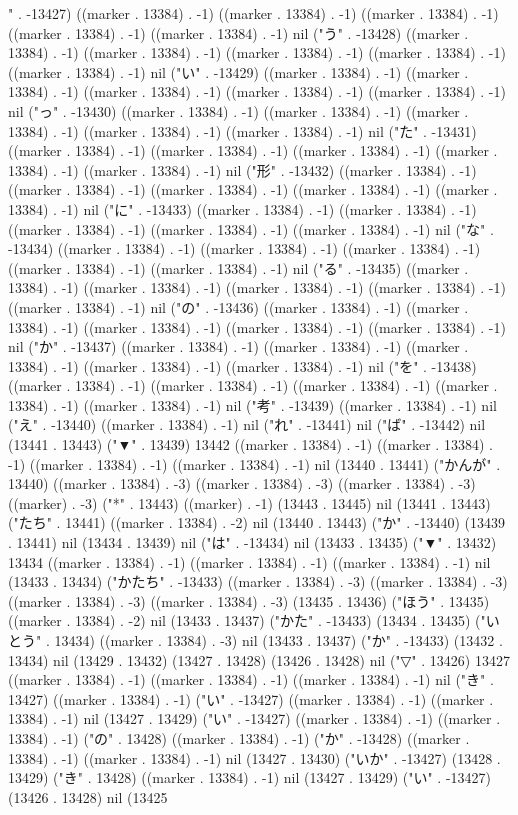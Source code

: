 " . -13427) ((marker . 13384) . -1) ((marker . 13384) . -1) ((marker . 13384) . -1) ((marker . 13384) . -1) ((marker . 13384) . -1) nil ("う" . -13428) ((marker . 13384) . -1) ((marker . 13384) . -1) ((marker . 13384) . -1) ((marker . 13384) . -1) ((marker . 13384) . -1) nil ("い" . -13429) ((marker . 13384) . -1) ((marker . 13384) . -1) ((marker . 13384) . -1) ((marker . 13384) . -1) ((marker . 13384) . -1) nil ("っ" . -13430) ((marker . 13384) . -1) ((marker . 13384) . -1) ((marker . 13384) . -1) ((marker . 13384) . -1) ((marker . 13384) . -1) nil ("た" . -13431) ((marker . 13384) . -1) ((marker . 13384) . -1) ((marker . 13384) . -1) ((marker . 13384) . -1) ((marker . 13384) . -1) nil ("形" . -13432) ((marker . 13384) . -1) ((marker . 13384) . -1) ((marker . 13384) . -1) ((marker . 13384) . -1) ((marker . 13384) . -1) nil ("に" . -13433) ((marker . 13384) . -1) ((marker . 13384) . -1) ((marker . 13384) . -1) ((marker . 13384) . -1) ((marker . 13384) . -1) nil ("な" . -13434) ((marker . 13384) . -1) ((marker . 13384) . -1) ((marker . 13384) . -1) ((marker . 13384) . -1) ((marker . 13384) . -1) nil ("る" . -13435) ((marker . 13384) . -1) ((marker . 13384) . -1) ((marker . 13384) . -1) ((marker . 13384) . -1) ((marker . 13384) . -1) nil ("の" . -13436) ((marker . 13384) . -1) ((marker . 13384) . -1) ((marker . 13384) . -1) ((marker . 13384) . -1) ((marker . 13384) . -1) nil ("か" . -13437) ((marker . 13384) . -1) ((marker . 13384) . -1) ((marker . 13384) . -1) ((marker . 13384) . -1) ((marker . 13384) . -1) nil ("を" . -13438) ((marker . 13384) . -1) ((marker . 13384) . -1) ((marker . 13384) . -1) ((marker . 13384) . -1) ((marker . 13384) . -1) nil ("考" . -13439) ((marker . 13384) . -1) nil ("え" . -13440) ((marker . 13384) . -1) nil ("れ" . -13441) nil ("ば" . -13442) nil (13441 . 13443) ("▼" . 13439) 13442 ((marker . 13384) . -1) ((marker . 13384) . -1) ((marker . 13384) . -1) ((marker . 13384) . -1) nil (13440 . 13441) ("かんが" . 13440) ((marker . 13384) . -3) ((marker . 13384) . -3) ((marker . 13384) . -3) ((marker) . -3) ("*" . 13443) ((marker) . -1) (13443 . 13445) nil (13441 . 13443) ("たち" . 13441) ((marker . 13384) . -2) nil (13440 . 13443) ("か" . -13440) (13439 . 13441) nil (13434 . 13439) nil ("は" . -13434) nil (13433 . 13435) ("▼" . 13432) 13434 ((marker . 13384) . -1) ((marker . 13384) . -1) ((marker . 13384) . -1) nil (13433 . 13434) ("かたち" . -13433) ((marker . 13384) . -3) ((marker . 13384) . -3) ((marker . 13384) . -3) ((marker . 13384) . -3) (13435 . 13436) ("ほう" . 13435) ((marker . 13384) . -2) nil (13433 . 13437) ("かた" . -13433) (13434 . 13435) ("いとう" . 13434) ((marker . 13384) . -3) nil (13433 . 13437) ("か" . -13433) (13432 . 13434) nil (13429 . 13432) (13427 . 13428) (13426 . 13428) nil ("▽" . 13426) 13427 ((marker . 13384) . -1) ((marker . 13384) . -1) ((marker . 13384) . -1) nil ("き" . 13427) ((marker . 13384) . -1) ("い" . -13427) ((marker . 13384) . -1) ((marker . 13384) . -1) nil (13427 . 13429) ("い" . -13427) ((marker . 13384) . -1) ((marker . 13384) . -1) ("の" . 13428) ((marker . 13384) . -1) ("か" . -13428) ((marker . 13384) . -1) ((marker . 13384) . -1) nil (13427 . 13430) ("いか" . -13427) (13428 . 13429) ("き" . 13428) ((marker . 13384) . -1) nil (13427 . 13429) ("い" . -13427) (13426 . 13428) nil (13425 
